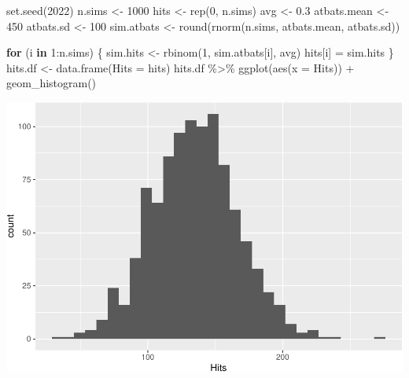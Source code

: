 \documentclass[
  11pt,
]{book}
\newenvironment{Shaded}{\begin{snugshade}}{\end{snugshade}}
\newcommand{\AttributeTok}[1]{\textcolor[rgb]{0.77,0.63,0.00}{#1}}
\newcommand{\ControlFlowTok}[1]{\textcolor[rgb]{0.13,0.29,0.53}{\textbf{#1}}}
\newcommand{\DecValTok}[1]{\textcolor[rgb]{0.00,0.00,0.81}{#1}}
\newcommand{\FloatTok}[1]{\textcolor[rgb]{0.00,0.00,0.81}{#1}}
\newcommand{\FunctionTok}[1]{\textcolor[rgb]{0.00,0.00,0.00}{#1}}
\newcommand{\NormalTok}[1]{#1}
\newcommand{\OtherTok}[1]{\textcolor[rgb]{0.56,0.35,0.01}{#1}}
\newcommand{\SpecialCharTok}[1]{\textcolor[rgb]{0.00,0.00,0.00}{#1}}
\theoremstyle{definition}
\theoremstyle{definition}
\theoremstyle{definition}
\theoremstyle{definition}
\theoremstyle{remark}
\begin{document}
\begin{Shaded}
\begin{Highlighting}[]
\FunctionTok{set.seed}\NormalTok{(}\DecValTok{2022}\NormalTok{)}
\NormalTok{n.sims }\OtherTok{\textless{}{-}} \DecValTok{1000}
\NormalTok{hits }\OtherTok{\textless{}{-}} \FunctionTok{rep}\NormalTok{(}\DecValTok{0}\NormalTok{, n.sims)}
\NormalTok{avg }\OtherTok{\textless{}{-}} \FloatTok{0.3}
\NormalTok{atbats.mean }\OtherTok{\textless{}{-}} \DecValTok{450}
\NormalTok{atbats.sd }\OtherTok{\textless{}{-}} \DecValTok{100}
\NormalTok{sim.atbats }\OtherTok{\textless{}{-}} \FunctionTok{round}\NormalTok{(}\FunctionTok{rnorm}\NormalTok{(n.sims, atbats.mean, atbats.sd))}

\ControlFlowTok{for}\NormalTok{ (i }\ControlFlowTok{in} \DecValTok{1}\SpecialCharTok{:}\NormalTok{n.sims) \{}
\NormalTok{    sim.hits }\OtherTok{\textless{}{-}} \FunctionTok{rbinom}\NormalTok{(}\DecValTok{1}\NormalTok{, sim.atbats[i], avg)}
\NormalTok{    hits[i] }\OtherTok{=}\NormalTok{ sim.hits}
\NormalTok{\}}
\NormalTok{hits.df }\OtherTok{\textless{}{-}} \FunctionTok{data.frame}\NormalTok{(}\AttributeTok{Hits =}\NormalTok{ hits)}
\NormalTok{hits.df }\SpecialCharTok{\%\textgreater{}\%}
    \FunctionTok{ggplot}\NormalTok{(}\FunctionTok{aes}\NormalTok{(}\AttributeTok{x =}\NormalTok{ Hits)) }\SpecialCharTok{+} \FunctionTok{geom\_histogram}\NormalTok{()}
\end{Highlighting}
\end{Shaded}

\includegraphics{series_files/figure-latex/baseball-sim-1.pdf}

  
\end{document}
